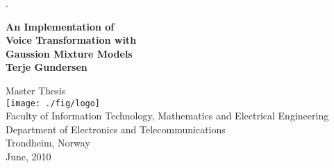 \begin{titlepage}
 
\begin{center}
 
\color{white} .\\[1cm]
\color{black}

{ \huge \textbf{An Implementation of \\[0.2cm] Voice Transformation with \\[0.5cm] Gaussion Mixture Models}}\\[3.5cm]
 
{\LARGE \bf Terje Gundersen}
 
\vfill

\large Master Thesis \\[2cm]

\texttt{[image: ./fig/logo]}\\[0.5cm]
 
\large Faculty of Information Technology, Mathematics and Electrical Engineering \\
Department of Electronics and Telecommunications\\
Trondheim, Norway\\[0.5cm]


June, 2010
 
\end{center}
 
\end{titlepage}
